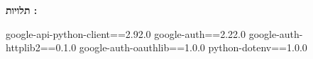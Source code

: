 
\textbf{תלויות :}

\begin{pythonbox}
google-api-python-client==2.92.0
google-auth==2.22.0
google-auth-httplib2==0.1.0
google-auth-oauthlib==1.0.0
python-dotenv==1.0.0
\end{pythonbox}

